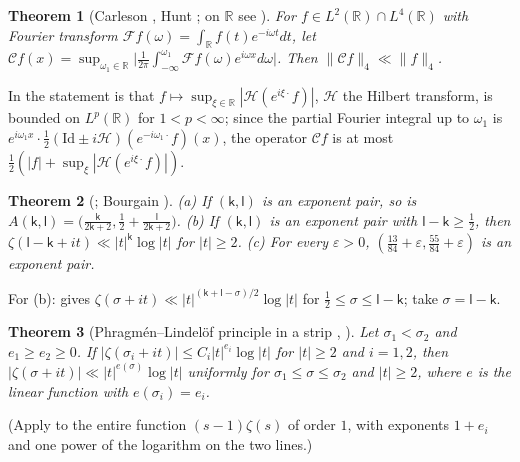 \documentclass[preprint,12pt]{elsarticle}
\numberwithin{equation}{section}
\theoremstyle{plain}
\newtheorem{theorem}{Theorem}[section]
\theoremstyle{definition}
\theoremstyle{remark}
\newcommand{\R}{\mathbb R}
\begin{document}
\begin{theorem}[Carleson {\cite{Carleson1966}}, Hunt {\cite{Hunt1968}}; on $\R$ see {\cite{Lerner2013}}]\label{thm:known_carleson}
For $f\in L^2(\R)\cap L^4(\R)$ with Fourier transform $\mathcal Ff(\omega)=\int_\R f(t)e^{-i\omega t}dt$, let $\mathcal Cf(x)=\sup_{\omega_1\in\R}\bigl|\frac1{2\pi}\int_{-\infty}^{\omega_1}\mathcal Ff(\omega)e^{i\omega x}d\omega\bigr|$. Then $\|\mathcal Cf\|_4\ll\|f\|_4$.
\end{theorem}
In \cite{Lerner2013} the statement is that $f\mapsto\sup_{\xi\in\R}|\mathcal H(e^{i\xi\cdot}f)|$, $\mathcal H$ the Hilbert transform, is bounded on $L^p(\R)$ for $1<p<\infty$; since the partial Fourier integral up to $\omega_1$ is $e^{i\omega_1x}\cdot\frac12(\mathrm{Id}\pm i\mathcal H)(e^{-i\omega_1\cdot}f)(x)$, the operator $\mathcal Cf$ is at most $\frac12(|f|+\sup_\xi|\mathcal H(e^{i\xi\cdot}f)|)$.

\begin{theorem}[{\cite[Lemma~2.8 and (7.57)]{Ivic1985}}; Bourgain {\cite[\S5, Thm.~6]{Bourgain2017}}]\label{thm:known_exponents}
(a) If $(\mathsf k,\mathsf l)$ is an exponent pair, so is $A(\mathsf k,\mathsf l)=\bigl(\frac{\mathsf k}{2\mathsf k+2},\frac12+\frac{\mathsf l}{2\mathsf k+2}\bigr)$. (b) If $(\mathsf k,\mathsf l)$ is an exponent pair with $\mathsf l-\mathsf k\ge\frac12$, then $\zeta(\mathsf l-\mathsf k+it)\ll|t|^{\mathsf k}\log|t|$ for $|t|\ge2$. (c) For every $\varepsilon>0$, $(\frac{13}{84}+\varepsilon,\frac{55}{84}+\varepsilon)$ is an exponent pair.
\end{theorem}
For (b): \cite[(7.57)]{Ivic1985} gives $\zeta(\sigma+it)\ll|t|^{(\mathsf k+\mathsf l-\sigma)/2}\log|t|$ for $\frac12\le\sigma\le\mathsf l-\mathsf k$; take $\sigma=\mathsf l-\mathsf k$.

\begin{theorem}[Phragm\'en--Lindel\"of principle in a strip {\cite[Lemma~2.5]{BellottiWong2025}}, {\cite[Lemma~3]{Trudgian2014}}]\label{thm:known_PL}
Let $\sigma_1<\sigma_2$ and $e_1\ge e_2\ge0$. If $|\zeta(\sigma_i+it)|\le C_i|t|^{e_i}\log|t|$ for $|t|\ge2$ and $i=1,2$, then $|\zeta(\sigma+it)|\ll|t|^{e(\sigma)}\log|t|$ uniformly for $\sigma_1\le\sigma\le\sigma_2$ and $|t|\ge2$, where $e$ is the linear function with $e(\sigma_i)=e_i$.
\end{theorem}
(Apply \cite[Lemma~2.5]{BellottiWong2025} to the entire function $(s-1)\zeta(s)$ of order $1$, with exponents $1+e_i$ and one power of the logarithm on the two lines.)
\end{document}
